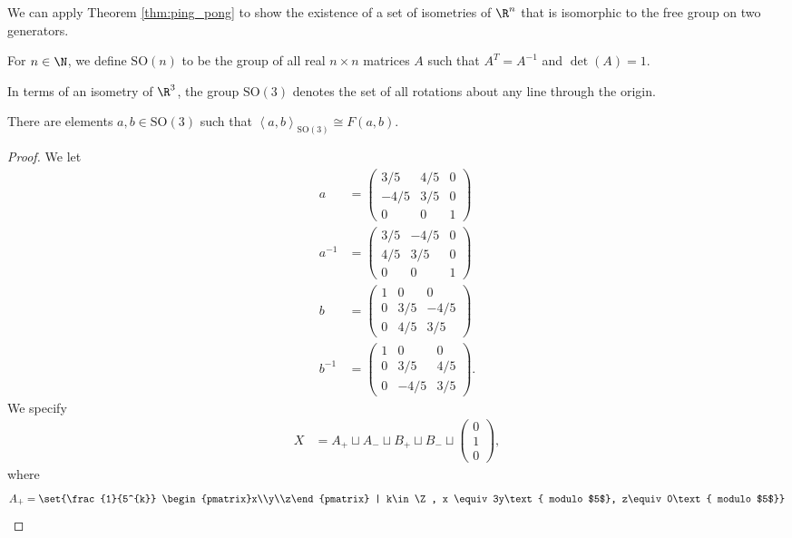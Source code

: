 We can apply Theorem \ref{thm:ping_pong} to show the existence of a set of isometries of $\R^n$ that is isomorphic to the free group on two generators.
\begin{definition}
  For $n\in \N$, we define $\text{SO}(n)$ to be the group of all real $n\times n$ matrices $A$ such that $A^{T} = A^{-1}$ and $\det(A) = 1$.
\end{definition}
In terms of an isometry of $\R^3$, the group $\text{SO}(3)$ denotes the set of all rotations about any line through the origin.
\begin{theorem}
  There are elements $a,b\in \text{SO}(3)$ such that $\left\langle a,b \right\rangle_{\text{SO}(3)} \cong F(a,b)$.\label{thm:free_group_so3}
\end{theorem}
\begin{proof}
  We let
  \begin{align*}
    a &= \begin{pmatrix}3/5 & 4/5 & 0 \\ -4/5 & 3/5 & 0 \\ 0 & 0 & 1\end{pmatrix}\\
    a^{-1} &= \begin{pmatrix}3/5 & -4/5 & 0 \\ 4/5 & 3/5 & 0 \\ 0 & 0 & 1\end{pmatrix}\\
    b &= \begin{pmatrix}1 & 0 & 0 \\ 0 & 3/5 & -4/5 \\ 0 & 4/5 & 3/5\end{pmatrix}\\
    b^{-1} &= \begin{pmatrix}1 & 0 & 0 \\ 0 & 3/5 & 4/5 \\ 0 & -4/5 & 3/5\end{pmatrix}.
  \end{align*}
  We specify
  \begin{align*}
    X &= A_{+} \sqcup A_{-} \sqcup B_{+} \sqcup B_{-} \sqcup \begin{pmatrix}0\\1\\0\end{pmatrix},
  \end{align*}
  where
  \begin{align*}
    A_{+} &= \set{\frac{1}{5^{k}} \begin{pmatrix}x\\y\\z\end{pmatrix} | k\in \Z, x \equiv 3y\text{ modulo $5$}, z\equiv0\text{ modulo $5$}}\\

\end{align*}
\end{proof}
